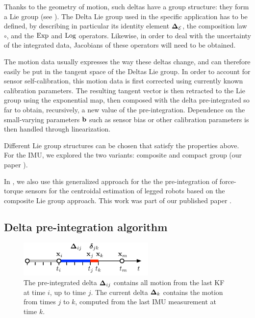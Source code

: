 Thanks to the geometry of motion, such deltas have a group structure: they form a Lie group (see ).
The Delta Lie group used in the specific application has to be defined, by describing in particular its identity element ${{\bm \Delta}}_{\mathcal{E}}$, the composition law $\circ$, and the $\operatorname*{Exp}$ and $\operatorname*{Log}$ operators. Likewise, in order to deal with the uncertainty of the integrated data, Jacobians of these operators will need to be obtained. 

The motion data usually expresses the way these deltas change, and can therefore easily be put in the tangent space of the Deltas Lie group. In order to account for sensor self-calibration, this motion data is first corrected using currently known calibration parameters. The resulting tangent vector is then retracted to the Lie group using the exponential map, then composed with the delta pre-integrated so far to obtain, recursively, a new value of the pre-integration.
Dependence on the small-varying parameters ${\bf b}$ such as sensor bias or other calibration parameters is then handled through linearization.


Different Lie group structures can be chosen that satisfy the properties above. For the IMU, we explored the two variants: composite \cite{forster2015imu} and compact group (our paper \cite{fourmy2019absolute}). 

In , we also use this generalized approach for the the pre-integration of force-torque sensors for the centroidal estimation of legged robots based on the composite Lie group approach. This work was part of our published paper \cite{fourmy2021contact}.





\subsection{Delta pre-integration algorithm}

\begin{figure}[tb]
    \centering
    \includegraphics[width=0.6\textwidth]{figures/delta_time}
    \caption{The pre-integrated delta ${{\bm \Delta}}_{ij}$ contains all motion from the last KF at time $i$, up to time $j$. 
    The current delta ${{\bm \Delta}}_k$ contains the motion from times $j$ to $k$, computed from the last IMU measurement at time $k$.}
    \label{fig:delta_time}
\end{figure}

